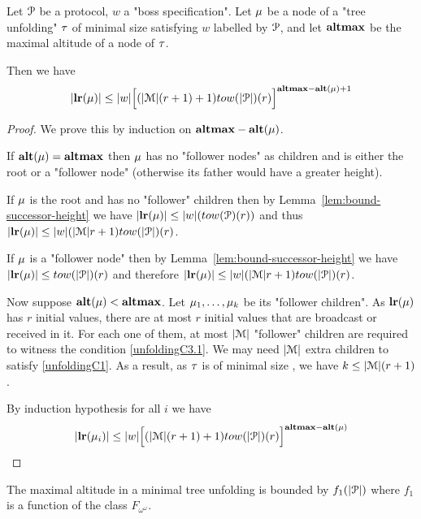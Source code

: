 \begin{lemma}
	\label{lem:bound-length-at-height-h}
	Let $\mathcal{P}$ be a protocol, $w$ a "boss specification".
	Let $\mu$ be a node of a "tree unfolding" $\tau$ of minimal size satisfying $w$ labelled by $\mathcal{P}$, and let $\mathbf{altmax}$ be the maximal altitude of a node of $\tau$.
	
	Then we have 
	\[
		\size{\localrunlabel{\node}} \leq \size{w} \Big[(\size{\messages}(r+1)+1) \towerfun(\size{\prot})(r)\Big]^{\altmax-\altitude{\node}+1}
	\] 
\end{lemma}

\ifproofs
\begin{proof}
	We prove this by induction on $\mathbf{altmax}-\mathbf{alt(\mu)}$.
	
	If $\mathbf{alt(\mu)} = \mathbf{altmax}$ then $\mu$ has no "follower nodes" as children and is either the root or a "follower node" (otherwise its father would have a greater height).
	
	If $\mu$ is the root and has no "follower" children then by Lemma~\ref{lem:bound-successor-height} we have $\size{\localrunlabel{\node}} \leq \size{w}(\towerfun(\prot)(r))$ and thus $\size{\localrunlabel{\node}} \leq \size{w}(\size{\messages}r+1) \towerfun(\size{\prot})(r)$.
	
	If $\mu$ is a "follower node" then by Lemma~\ref{lem:bound-successor-height} we have 
	$\size{\localrunlabel{\node}} \leq \towerfun(\size{\prot})(r)$ and therefore $\size{\localrunlabel{\node}} \leq \size{w}(\size{\messages}r+1) \towerfun(\size{\prot})(r)$.
	
	Now suppose $\mathbf{alt(\mu)} < \mathbf{altmax}$. Let $\mu_1, \ldots, \mu_k$ be its "follower children". 
	As $\mathbf{lr}(\mu)$ has $r$ initial values, there are at most $r$ initial values that are broadcast or received in it.
	For each one of them, at most $|\mathcal{M}|$ "follower" children are required to witness the condition \ref{unfoldingC3.1}.
	We may need $|\mathcal{M}|$ extra children to satisfy \ref{unfoldingC1}.
	As a result, as $\tau$ is of minimal size , we have $k \leq |\mathcal{M}|(r+1)$.
	
	By induction hypothesis for all $i$ we have 
	\[
	\size{\localrunlabel{\node_i}} \leq \size{w} \Big[(\size{\messages}(r+1)+1) \towerfun(\size{\prot})(r)\Big]^{\altmax-\altitude{\node}}
	\]
	
\end{proof}
\fi

\begin{lemma}
	\label{lem:bound-max-height}
	The maximal altitude in a minimal tree unfolding is bounded by $f_1(|\mathcal{P}|)$ where $f_1$ is a function of the class $F_{\omega^\omega}$.
\end{lemma}

